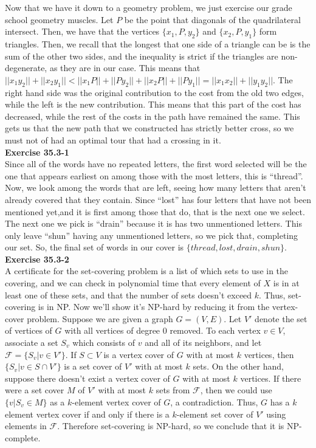 \documentclass{article}
\begin{document}
Now that we have it down to a geometry problem, we just exercise our grade school geometry muscles. Let $P$ be the point that diagonals of the quadrilateral intersect. Then, we have that the vertices $\{x_1,P,y_2\}$ and $\{x_2,P,y_1\}$ form triangles. Then, we recall that the longest that one side of a triangle can be is the sum of the other two sides, and the inequality is strict if the triangles are non-degenerate, as  they are in our case. This means that $||x_1y_2|| + ||x_2y_1|| < ||x_1P|| +||Py_2|| + ||x_2P|| + ||Py_1|| = ||x_1x_2|| + ||y_1y_2||$. The right hand side was the original contribution to the cost from the old two edges, while the left is the new contribution. This means that this part of the cost has decreased, while the rest of the costs in the path have remained the same. This gets us that the new path that we constructed has strictly better cross, so we must not of had an optimal tour that had a crossing in it.\\



\noindent\textbf{Exercise 35.3-1}\\

Since all of the words have no repeated letters, the first word selected will be the one that appears earliest on among those with the most letters, this is ``thread''. Now, we look among the words that are left, seeing how many letters that aren't already covered that they contain. Since ``lost'' has four letters that have not been mentioned yet,and it is first among those that do, that is the next one we select. The next one we pick is ``drain'' because it is has two unmentioned letters. This only leave ``shun'' having any unmentioned letters, so we pick that, completing our set. So, the final set of words in our cover is $\{thread,lost,drain,shun\}$.\\

\noindent\textbf{Exercise 35.3-2}\\

A certificate for the set-covering problem is a list of which sets to use in the covering, and we can check in polynomial time that every element of $X$ is in at least one of these sets, and that the number of sets doesn't exceed $k$.  Thus, set-covering is in NP.  Now we'll show it's NP-hard by reducing it from the vertex-cover problem.  Suppose we are given a graph $G = (V,E)$.  Let $V'$ denote the set of vertices of $G$ with all vertices of degree 0 removed.  To each vertex $v \in V$, associate a set $S_v$ which consists of $v$ and all of its neighbors, and let $\mathscr{F} = \{ S_v | v \in V'\}$.  If $S \subset V$ is a vertex cover of $G$ with at most $k$ vertices, then $\{S_v | v \in S \cap V'\}$ is a set cover of $V'$ with at most $k$ sets.  On the other hand, suppose there doesn't exist a vertex cover of $G$ with at most $k$ vertices.  If there were a set cover $M$ of $V'$ with at most $k$ sets from $\mathscr{F}$, then we could use $\{v | S_v \in M\}$ as a $k$-element vertex cover of $G$, a contradiction.  Thus, $G$ has a $k$ element vertex cover if and only if there is a $k$-element set cover of $V'$ using elements in $\mathscr{F}$.  Therefore set-covering is NP-hard, so we conclude that it is NP-complete. \\
\end{document}

